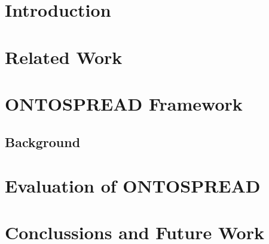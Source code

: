 \documentclass{llncs}
\begin{document}

\section{Introduction}

\section{Related Work}\label{related-work}

\section{ONTOSPREAD Framework}
\subsection{Background}\label{background}


\section{Evaluation of ONTOSPREAD}

\section{Conclussions and Future Work}





\end{document}
